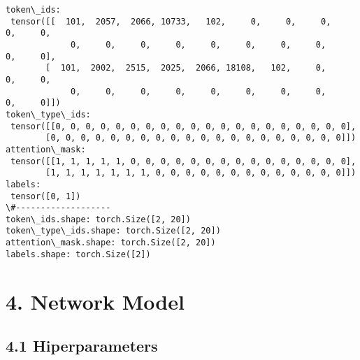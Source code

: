 \documentclass[10pt]{article}
\begin{document}
    \begin{Verbatim}[commandchars=\\\{\}]
token\_ids:
 tensor([[  101,  2057,  2066, 10733,   102,     0,     0,     0,     0,     0,
             0,     0,     0,     0,     0,     0,     0,     0,     0,     0],
        [  101,  2002,  2515,  2025,  2066, 18108,   102,     0,     0,     0,
             0,     0,     0,     0,     0,     0,     0,     0,     0,     0]])
token\_type\_ids:
 tensor([[0, 0, 0, 0, 0, 0, 0, 0, 0, 0, 0, 0, 0, 0, 0, 0, 0, 0, 0, 0],
        [0, 0, 0, 0, 0, 0, 0, 0, 0, 0, 0, 0, 0, 0, 0, 0, 0, 0, 0, 0]])
attention\_mask:
 tensor([[1, 1, 1, 1, 1, 0, 0, 0, 0, 0, 0, 0, 0, 0, 0, 0, 0, 0, 0, 0],
        [1, 1, 1, 1, 1, 1, 1, 0, 0, 0, 0, 0, 0, 0, 0, 0, 0, 0, 0, 0]])
labels:
 tensor([0, 1])
\#-------------------
token\_ids.shape: torch.Size([2, 20])
token\_type\_ids.shape: torch.Size([2, 20])
attention\_mask.shape: torch.Size([2, 20])
labels.shape: torch.Size([2])
    \end{Verbatim}

    \hypertarget{network-model}{%
\section*{4. Network Model}\label{network-model}}

    \hypertarget{hiperparameters}{%
\subsection*{4.1 Hiperparameters}\label{hiperparameters}}
\end{document}
